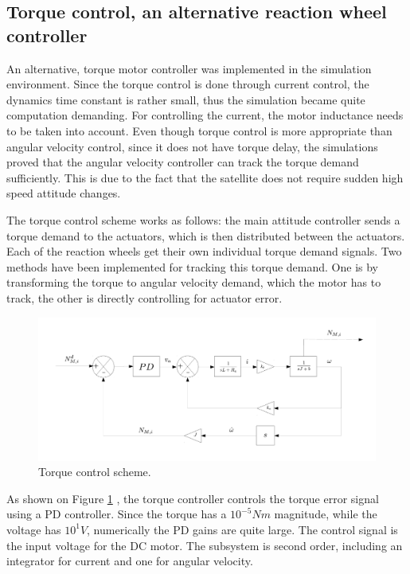 \subsection{Torque control, an alternative reaction wheel controller}

An alternative, torque motor controller was implemented in the simulation environment. Since the torque control is done through current control, the dynamics time constant is rather small, thus the simulation became quite computation demanding. For controlling the current, the motor inductance needs to be taken into account. Even though torque control is more appropriate than angular velocity control, since it does not have torque delay, the simulations proved that the angular velocity controller can track the torque demand sufficiently. This is due to the fact that the satellite does not require sudden high speed attitude changes.

The torque control scheme works as follows: the main attitude controller sends a torque demand to the actuators, which is then distributed between the actuators. Each of the reaction wheels get their own individual torque demand signals. Two methods have been implemented for tracking this torque demand. One is by transforming the torque to angular velocity demand, which the motor has to track, the other is directly controlling for actuator error.

\begin{figure}[h!]
	\centering 
	\includegraphics[width=170mm]{figures/torqueControl.pdf}	
	\caption{Torque control scheme.}
	\label{fig:torqueControl}
\end{figure}

As shown on Figure \ref{fig:torqueControl} , the torque controller controls the torque error signal using a PD controller. Since the torque has a $ 10^{-5} Nm$ magnitude, while the voltage has $ 10^1 V$, numerically the PD gains are quite large. The control signal is the input voltage for the DC motor. The subsystem is second order, including an integrator for current and one for angular velocity.
